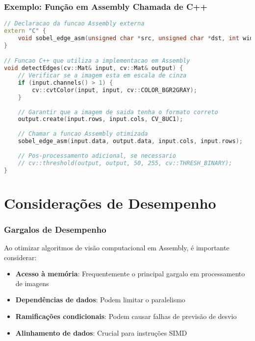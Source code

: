 \documentclass[11pt]{beamer}
\begin{document}
\begin{frame}[fragile]
\frametitle{Exemplo: Função em Assembly Chamada de C++}

\begin{lstlisting}[language=C++, basicstyle=\tiny]
// Declaracao da funcao Assembly externa
extern "C" {
    void sobel_edge_asm(unsigned char *src, unsigned char *dst, int width, int height);
}

// Funcao C++ que utiliza a implementacao em Assembly
void detectEdges(cv::Mat& input, cv::Mat& output) {
    // Verificar se a imagem esta em escala de cinza
    if (input.channels() > 1) {
        cv::cvtColor(input, input, cv::COLOR_BGR2GRAY);
    }
    
    // Garantir que a imagem de saida tenha o formato correto
    output.create(input.rows, input.cols, CV_8UC1);
    
    // Chamar a funcao Assembly otimizada
    sobel_edge_asm(input.data, output.data, input.cols, input.rows);
    
    // Pos-processamento adicional, se necessario
    // cv::threshold(output, output, 50, 255, cv::THRESH_BINARY);
}
\end{lstlisting}

\end{frame}

\section{Considerações de Desempenho}

\begin{frame}
\frametitle{Gargalos de Desempenho}

Ao otimizar algoritmos de visão computacional em Assembly, é importante considerar:

\begin{itemize}
    \item \textbf{Acesso à memória}: Frequentemente o principal gargalo em processamento de imagens
    \item \textbf{Dependências de dados}: Podem limitar o paralelismo
    \item \textbf{Ramificações condicionais}: Podem causar falhas de previsão de desvio
    \item \textbf{Alinhamento de dados}: Crucial para instruções SIMD
\end{itemize}

\end{frame}
\end{document}
